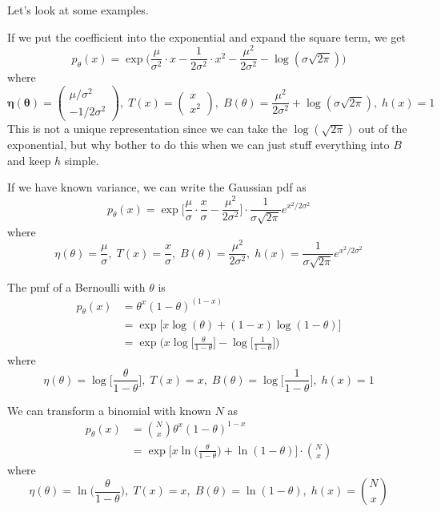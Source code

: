   Let's look at some examples. 

  \begin{example}[Gaussian]
    If we put the coefficient into the exponential and expand the square term, we get 
    \[p_\theta (x) = \exp \bigg( \frac{\mu}{\sigma^2} \cdot x - \frac{1}{2\sigma^2} \cdot x^2 - \frac{\mu^2}{2 \sigma^2} - \log ( \sigma \sqrt{2 \pi}) \bigg)\] 
    where 
    \[\boldsymbol{\eta}(\boldsymbol{\theta}) = \begin{pmatrix} \mu /\sigma^2 \\ -1 / 2 \sigma^2 \end{pmatrix}, \; T(x) = \begin{pmatrix} x \\ x^2 \end{pmatrix}, \; B(\theta) = \frac{\mu^2}{2 \sigma^2} + \log(\sigma \sqrt{2 \pi}), \; h(x) = 1\]
    This is not a unique representation since we can take the $\log(\sqrt{2 \pi})$ out of the exponential, but why bother to do this when we can just stuff everything into $B$ and keep $h$ simple. 
  \end{example}

  \begin{example}
    If we have known variance, we can write the Gaussian pdf as 
    \[p_\theta (x) = \exp \bigg[ \frac{\mu}{\sigma} \cdot \frac{x}{\sigma} - \frac{\mu^2}{2 \sigma^2} \bigg] \cdot \frac{1}{\sigma \sqrt{2\pi}} e^{x^2/2 \sigma^2}\]
    where 
    \[\eta(\theta) = \frac{\mu}{\sigma}, \; T(x) = \frac{x}{\sigma}, \; B(\theta) = \frac{\mu^2}{2 \sigma^2}, \; h(x) = \frac{1}{\sigma \sqrt{2 \pi}} e^{x^2/2 \sigma^2}\]
  \end{example}

  \begin{example}[Bernoulli]
  The pmf of a Bernoulli with $\theta$ is 
  \begin{align*}
      p_\theta (x) & = \theta^x (1 - \theta)^{(1 - x)} \\
      & = \exp \big[x \log (\theta) + (1 - x)\log(1 - \theta) \big] \\
      & = \exp \bigg( x \log \Big[ \frac{\theta}{1 - \theta} \Big] - \log \Big[ \frac{1}{1 - \theta} \Big] \bigg)
  \end{align*}
  where 
  \[\eta(\theta) = \log \Big[ \frac{\theta}{1 - \theta} \Big], \; T(x) = x, \; B(\theta) = \log \Big[ \frac{1}{1 - \theta} \Big], \; h(x) = 1\]
  \end{example}


  \begin{example}
  We can transform a binomial with known $N$ as 
  \begin{align*}
    p_\theta (x) &  = \binom{N}{x} \theta^x  (1 - \theta)^{1 - x} \\
                 & = \exp \bigg[ x \ln \big( \frac{\theta}{1 - \theta} \Big) + \ln(1 - \theta) \bigg] \cdot \binom{N}{x} 
  \end{align*}
  where 
    \[\eta (\theta) = \ln \big( \frac{\theta}{1 - \theta} \Big), \; T(x) = x, \; B(\theta) = \ln(1 - \theta), \; h(x) = \binom{N}{x}\]
  \end{example}

